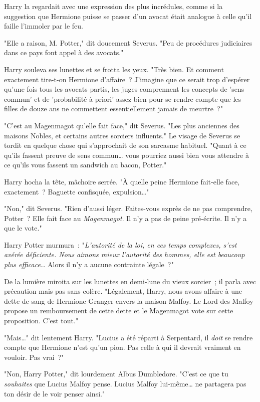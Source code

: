 Harry la regardait avec une expression des plus incrédules, comme si la suggestion que Hermione puisse se passer d'un avocat était analogue à celle qu'il faille l'immoler par le feu.

"Elle a raison, M. Potter," dit doucement Severus. "Peu de procédures judiciaires dans ce pays font appel à des avocats."

Harry souleva ses lunettes et se frotta les yeux. "Très bien. Et comment exactement tire-t-on Hermione d'affaire~? J'imagine que ce serait trop d'espérer qu'une fois tous les avocats partis, les juges comprennent les concepts de 'sens commun' et de 'probabilité à priori' assez bien pour se rendre compte que les filles de douze ans ne commettent essentiellement jamais de meurtre~?"

"C'est au Magenmagot qu'elle fait face," dit Severus. "Les plus anciennes des maisons Nobles, et certains autres sorciers influents." Le visage de Severus se tordit en quelque chose qui s'approchait de son sarcasme habituel. "Quant à ce qu'ils fassent preuve de sens commun… vous pourriez aussi bien vous attendre à ce qu'ils vous fassent un sandwich au bacon, Potter."

Harry hocha la tête, mâchoire serrée. "À quelle peine Hermione fait-elle face, exactement~? Baguette confisquée, expulsion…"

"Non," dit Severus. "Rien d'aussi léger. Faites-vous exprès de ne pas comprendre, Potter~? Elle fait face au \emph{Magenmagot}. Il n'y a pas de peine pré-écrite. Il n'y a que le vote."

Harry Potter murmura~: "\emph{L'autorité de la loi, en ces temps complexes, s'est avérée déficiente. Nous aimons mieux l'autorité des hommes, elle est beaucoup plus efficace…} Alors il n'y a aucune contrainte légale~?"

De la lumière miroita sur les lunettes en demi-lune du vieux sorcier~; il parla avec précaution mais pas sans colère. "Légalement, Harry, nous avons affaire à une dette de sang de Hermione Granger envers la maison Malfoy. Le Lord des Malfoy propose un remboursement de cette dette et le Magenmagot vote sur cette proposition. C'est tout."

"Mais…" dit lentement Harry. "Lucius a été réparti à Serpentard, il \emph{doit} se rendre compte que Hermione n'est qu'un pion. Pas celle à qui il devrait vraiment en vouloir. Pas vrai~?"

"Non, Harry Potter," dit lourdement Albus Dumbledore. "C'est ce que tu \emph{souhaites} que Lucius Malfoy pense. Lucius Malfoy lui-même… ne partagera pas ton désir de le voir penser ainsi."

